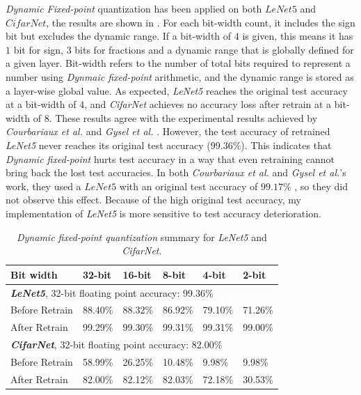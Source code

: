 \documentclass[a4paper,12pt]{report}
\begin{document}
\textit{Dynamic Fixed-point} quantization has been applied on both $LeNet5$
and $CifarNet$, the results are shown in .
For each bit-width count, it includes the sign bit but excludes the dynamic range.
If a bit-width of $4$ is given, this means it has $1$ bit for sign, $3$ bits for
fractions and a dynamic range that is globally defined for a given layer.
Bit-width refers to the number of total bits required to represent a number using
\textit{Dynmaic fixed-point} arithmetic, and the dynamic range is stored as a layer-wise global
value.
As expected, \textit{LeNet5} reaches the original test accuracy at a bit-width of
$4$, and \textit{CifarNet} achieves no accuracy loss after retrain at a bit-width
of $8$.
These results agree with the experimental results achieved by \textit{Courbariaux et al.}
\cite{courbariaux2014training} and \textit{Gysel et al.} \cite{Gysel}.
However, the test accuracy of retrained \textit{LeNet5} never reaches its
original test accuracy ($99.36\%$).
This indicates that \textit{Dynamic fixed-point} hurts test accuracy in a way
that even retraining cannot bring back the lost test accuracies.
In both \textit{Courbariaux et al.} and \textit{Gysel et al.}'s work, they used
a $LeNet5$ with an original test accuracy of $99.17\%$ \cite{courbariaux2014training,Gysel},
so they did not observe this effect.
Because of the high original test accuracy, my implementation of \textit{LeNet5}
is more sensitive to test accuracy deterioration.

\begin{table}[!h]
  \centering
  \begin{tabular}{llllll}
    \hline
    \hline
    Bit width               &32-bit     &16-bit     &8-bit    &4-bit    &2-bit  \\
    \hline
    \multicolumn{5}{l}{\textbf{\textit{LeNet5}}, 32-bit floating point accuracy: 99.36\%}\\
    \hline
    \hline
    Before Retrain          &88.40\%    &88.32\%    &86.92\%    &79.10\%  &71.26\%\\
    After Retrain           &99.29\%    &99.30\%    &99.31\%    &99.31\%  &99.00\%\\
    \hline
    \hline
    \multicolumn{5}{l}{\textbf{\textit{CifarNet}}, 32-bit floating point accuracy: 82.00\%}\\
    \hline
    Before Retrain          &58.99\%        &26.25\%    &10.48\%  &9.98\%  &9.98\%\\
    After Retrain           &82.00\%        &82.12\%    &82.03\%  &72.18\%  &30.53\%\\
    \hline
    \hline
  \end{tabular}
  \caption{\textit{Dynamic fixed-point quantization} summary for \textit{LeNet5} and \textit{CifarNet}.}
  \label{tab:dfp_sum}
\end{table}
\end{document}
